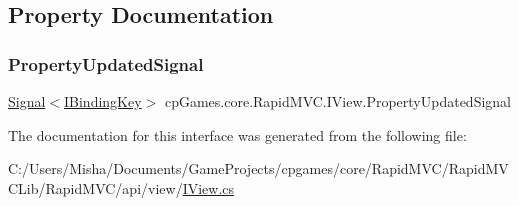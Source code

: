 \subsection{Property Documentation}
\mbox{\label{interfacecp_games_1_1core_1_1_rapid_m_v_c_1_1_i_view_ae21e2d124f1e977c79babb40c3e991e8}} 
\subsubsection{\texorpdfstring{PropertyUpdatedSignal}{PropertyUpdatedSignal}}
{\footnotesize\ttfamily \mbox{\hyperlink{classcp_games_1_1core_1_1_rapid_m_v_c_1_1_signal}{Signal}}$<$\mbox{\hyperlink{interfacecp_games_1_1core_1_1_rapid_m_v_c_1_1_i_binding_key}{I\+Binding\+Key}}$>$ cp\+Games.\+core.\+Rapid\+M\+V\+C.\+I\+View.\+Property\+Updated\+Signal\hspace{0.3cm}{\ttfamily [get]}}



The documentation for this interface was generated from the following file\+:\begin{DoxyCompactItemize}
\item 
C\+:/\+Users/\+Misha/\+Documents/\+Game\+Projects/cpgames/core/\+Rapid\+M\+V\+C/\+Rapid\+M\+V\+C\+Lib/\+Rapid\+M\+V\+C/api/view/\mbox{\hyperlink{_i_view_8cs}{I\+View.\+cs}}\end{DoxyCompactItemize}
